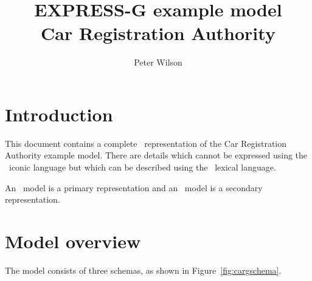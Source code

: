 \documentclass{article}
\title{EXPRESS-G example model \\ Car Registration Authority}
\author{Peter Wilson}
\date{}
\begin{document}
\maketitle

\tableofcontents
\listoffigures
\clearpage


\makeatletter \@topnum\z@ \makeatother
\section{Introduction}

This document contains a complete \ExpressG\ representation of the 
Car Registration Authority example model. There are details which cannot
be expressed using the \ExpressG\ iconic language but which can be described
using the \Express\ lexical language.

    An \Express\ model is a primary representation and an \ExpressG\ model
is a secondary representation.

\section{Model overview}

The model consists of three schemas, as shown in Figure~\ref{fig:cargschema}.
\end{document}

